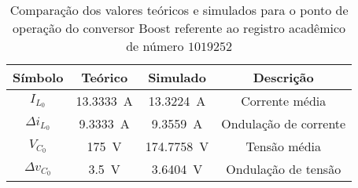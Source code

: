 \begin{table}[!ht]
\centering
\caption{Comparação dos valores teóricos e simulados para o ponto de operação do conversor Boost referente ao registro acadêmico de número $1019252$}
\label{tab:steadystatesim}
\begin{tabular}{@{}cccc@{}}
\toprule
\textbf{Símbolo} & \textbf{Teórico} & \textbf{Simulado} & \textbf{Descrição}\\ \midrule
$I_{L_0}$ & \SI{13.3333}{\A} & \SI{13.3224}{\A} & Corrente média\\
$\Delta{i_{L_0}}$  & \SI{9.3333}{\A} & \SI{9.3559}{\A}& Ondulação de corrente\\
$V_{C_0}$ & \SI{175}{\V} & \SI{174.7758}{\V} & Tensão média\\
$\Delta{v_{C_0}}$  & \SI{3.5}{\V} & \SI{3.6404}{\V}& Ondulação de tensão \\
\bottomrule
\end{tabular}
\end{table}

